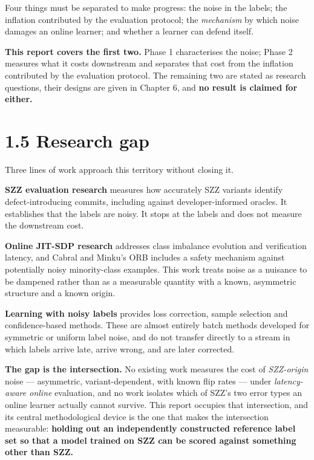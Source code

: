 Four things must be separated to make progress: the noise in the labels;
the inflation contributed by the evaluation protocol; the
\emph{mechanism} by which noise damages an online learner; and whether a
learner can defend itself.

\textbf{This report covers the first two.} Phase 1 characterises the
noise; Phase 2 measures what it costs downstream and separates that cost
from the inflation contributed by the evaluation protocol. The remaining
two are stated as research questions, their designs are given in Chapter
6, and \textbf{no result is claimed for either.}

\section{1.5 Research gap}\label{research-gap}

Three lines of work approach this territory without closing it.

\textbf{SZZ evaluation research} measures how accurately SZZ variants
identify defect-introducing commits, including against
developer-informed oracles. It establishes that the labels are noisy. It
stops at the labels and does not measure the downstream cost.

\textbf{Online JIT-SDP research} addresses class imbalance evolution and
verification latency, and Cabral and Minku's ORB includes a safety
mechanism against potentially noisy minority-class examples. This work
treats noise as a nuisance to be dampened rather than as a measurable
quantity with a known, asymmetric structure and a known origin.

\textbf{Learning with noisy labels} provides loss correction, sample
selection and confidence-based methods. These are almost entirely batch
methods developed for symmetric or uniform label noise, and do not
transfer directly to a stream in which labels arrive late, arrive wrong,
and are later corrected.

\textbf{The gap is the intersection.} No existing work measures the cost
of \emph{SZZ-origin} noise --- asymmetric, variant-dependent, with known
flip rates --- under \emph{latency-aware online} evaluation, and no work
isolates which of SZZ's two error types an online learner actually
cannot survive. This report occupies that intersection, and its central
methodological device is the one that makes the intersection measurable:
\textbf{holding out an independently constructed reference label set so
that a model trained on SZZ can be scored against something other than
SZZ.}


